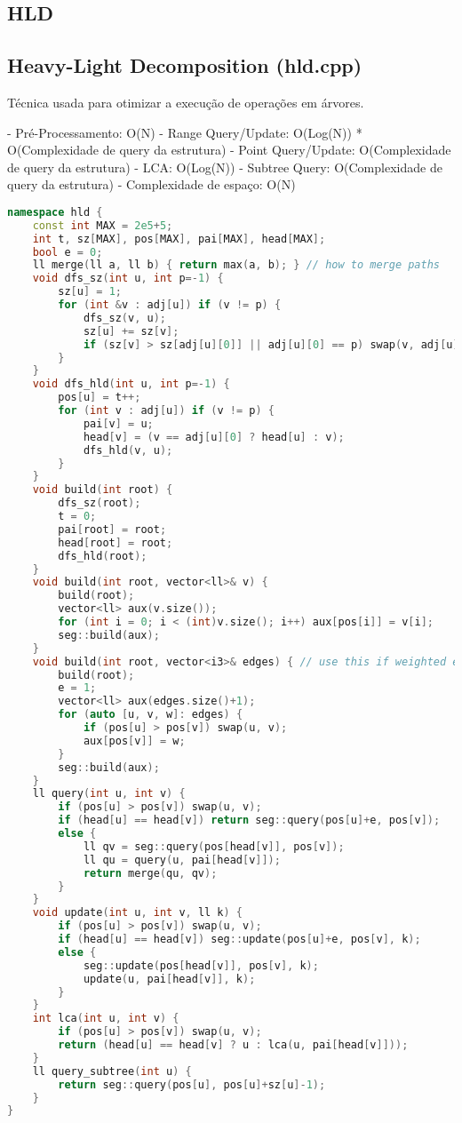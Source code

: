 \documentclass[11pt, a4paper, twoside]{article}
\begin{document}
\subsection{HLD}

\subsection{Heavy-Light Decomposition (hld.cpp)}


Técnica usada para otimizar a execução de operações em árvores.

- Pré-Processamento: O(N)
- Range Query/Update: O(Log(N)) * O(Complexidade de query da estrutura)
- Point Query/Update: O(Complexidade de query da estrutura)
- LCA: O(Log(N))
- Subtree Query: O(Complexidade de query da estrutura)
- Complexidade de espaço: O(N)


\begin{lstlisting}[language=C++]
namespace hld {
    const int MAX = 2e5+5;
    int t, sz[MAX], pos[MAX], pai[MAX], head[MAX];
    bool e = 0;
    ll merge(ll a, ll b) { return max(a, b); } // how to merge paths
    void dfs_sz(int u, int p=-1) {
        sz[u] = 1;
        for (int &v : adj[u]) if (v != p) {
            dfs_sz(v, u);
            sz[u] += sz[v];
            if (sz[v] > sz[adj[u][0]] || adj[u][0] == p) swap(v, adj[u][0]);
        }
    }
    void dfs_hld(int u, int p=-1) {
        pos[u] = t++;
        for (int v : adj[u]) if (v != p) {
            pai[v] = u;
            head[v] = (v == adj[u][0] ? head[u] : v);
            dfs_hld(v, u);
        }
    }
    void build(int root) {
        dfs_sz(root);
        t = 0;
        pai[root] = root;
        head[root] = root;
        dfs_hld(root);
    }
    void build(int root, vector<ll>& v) {
        build(root);
        vector<ll> aux(v.size());
        for (int i = 0; i < (int)v.size(); i++) aux[pos[i]] = v[i];
        seg::build(aux);
    }
    void build(int root, vector<i3>& edges) { // use this if weighted edges
        build(root);
        e = 1;
        vector<ll> aux(edges.size()+1);
        for (auto [u, v, w]: edges) {
            if (pos[u] > pos[v]) swap(u, v);
            aux[pos[v]] = w;
        } 
        seg::build(aux);
    }
    ll query(int u, int v) {
        if (pos[u] > pos[v]) swap(u, v);
        if (head[u] == head[v]) return seg::query(pos[u]+e, pos[v]);
        else {
            ll qv = seg::query(pos[head[v]], pos[v]);
            ll qu = query(u, pai[head[v]]);
            return merge(qu, qv);
        }
    }
    void update(int u, int v, ll k) {
        if (pos[u] > pos[v]) swap(u, v);
        if (head[u] == head[v]) seg::update(pos[u]+e, pos[v], k);
        else {
            seg::update(pos[head[v]], pos[v], k);
            update(u, pai[head[v]], k);
        }
    }
    int lca(int u, int v) {
        if (pos[u] > pos[v]) swap(u, v);
        return (head[u] == head[v] ? u : lca(u, pai[head[v]]));
    }
    ll query_subtree(int u) {
        return seg::query(pos[u], pos[u]+sz[u]-1);
    }
}
\end{lstlisting}
\end{document}
